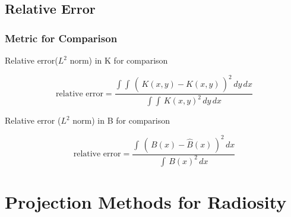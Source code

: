 


  \subsection{Relative Error}

    \begin{frame}\frametitle{Metric for Comparison}
        
        Relative error($L^2$ norm) in K for comparison
        
        \begin{equation}
        \text{relative  error}=\frac{\int\int \,(\,K(x,y)-\hat{K}(x,y)\,)^2  \,dy \, dx}{\int\int \,K(x,y)^2  \,dy \, dx}
        \end{equation}
        
        Relative error ($L^2$ norm)  in B for comparison
        
        \begin{equation}
        \text{relative  error}=\frac{\int \,(\,B(x)-\hat{B}(x)\,)^2  \,dx}{\int \,B(x)^2  \,dx}
        \end{equation}
    \end{frame}



\section{Projection Methods for Radiosity}

